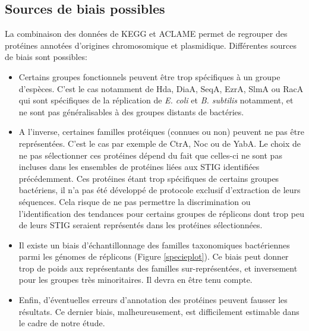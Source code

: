 \subsection{Sources de biais possibles}\label{parsourcebiais}
	La combinaison des données de KEGG et ACLAME permet de regrouper des protéines annotées d'origines chromosomique et plasmidique. Différentes sources de biais sont possibles:
\begin{itemize}
	\item Certains groupes fonctionnels peuvent être trop spécifiques à un groupe d'espèces. C'est le cas notamment de Hda, DiaA, SeqA, EzrA, SlmA ou RacA qui sont spécifiques de la réplication de \textit{E. coli} et \textit{B. subtilis} notamment, et ne sont pas généralisables à des groupes distants de bactéries.
	\item A l'inverse, certaines familles protéiques (connues ou non) peuvent ne pas être représentées. C'est le cas par exemple de CtrA, Noc ou de YabA. Le choix de ne pas sélectionner ces protéines dépend du fait que celles-ci ne sont pas incluses dans les ensembles de protéines liées aux STIG identifiées précédemment. Ces protéines étant trop spécifiques de certains groupes bactériens, il n'a pas été développé de protocole exclusif d'extraction de leurs séquences. Cela risque de ne pas permettre la discrimination ou l'identification des tendances pour certains groupes de réplicons dont trop peu de leurs STIG seraient représentés dans les protéines sélectionnées.
	\item Il existe un biais d'échantillonnage des familles taxonomiques bactériennes parmi les génomes de réplicons  (Figure \ref{specieplot}). Ce biais peut donner trop de poids aux représentants des familles sur-représentées, et inversement pour les groupes très minoritaires. Il devra en être tenu compte.
	\item Enfin, d'éventuelles erreurs d'annotation des protéines peuvent fausser les résultats. Ce dernier biais, malheureusement, est difficilement estimable dans le cadre de notre étude.
  \end{itemize}
 

